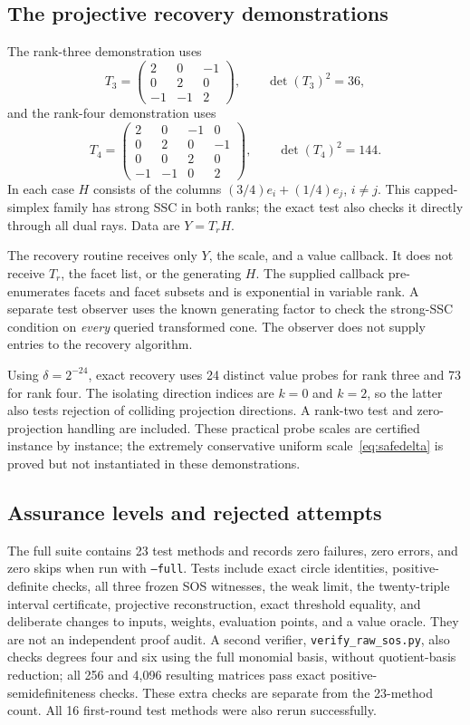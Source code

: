 \documentclass[11pt]{article}
\theoremstyle{definition}\newtheorem{definition}[theorem]{Definition}
\begin{document}
\subsection{The projective recovery demonstrations}
The rank-three demonstration uses
\begin{equation}
 T_3=\begin{pmatrix}2&0&-1\\0&2&0\\-1&-1&2\end{pmatrix},\qquad \det(T_3)^2=36,
\end{equation}
and the rank-four demonstration uses
\begin{equation}
 T_4=\begin{pmatrix}2&0&-1&0\\0&2&0&-1\\0&0&2&0\\-1&-1&0&2\end{pmatrix},\qquad \det(T_4)^2=144.
\end{equation}
In each case $H$ consists of the columns $(3/4)e_i+(1/4)e_j$, $i\ne j$. This capped-simplex family has strong SSC in both ranks; the exact test also checks it directly through all dual rays. Data are $Y=T_rH$.

The recovery routine receives only $Y$, the scale, and a value callback. It does not receive $T_r$, the facet list, or the generating $H$. The supplied callback pre-enumerates facets and facet subsets and is exponential in variable rank. A separate test observer uses the known generating factor to check the strong-SSC condition on \emph{every} queried transformed cone. The observer does not supply entries to the recovery algorithm.

Using $\delta=2^{-24}$, exact recovery uses 24 distinct value probes for rank three and 73 for rank four. The isolating direction indices are $k=0$ and $k=2$, so the latter also tests rejection of colliding projection directions. A rank-two test and zero-projection handling are included. These practical probe scales are certified instance by instance; the extremely conservative uniform scale~\eqref{eq:safedelta} is proved but not instantiated in these demonstrations.

\subsection{Assurance levels and rejected attempts}
The full suite contains 23 test methods and records zero failures, zero errors, and zero skips when run with \texttt{--full}. Tests include exact circle identities, positive-definite checks, all three frozen SOS witnesses, the weak limit, the twenty-triple interval certificate, projective reconstruction, exact threshold equality, and deliberate changes to inputs, weights, evaluation points, and a value oracle. They are not an independent proof audit. A second verifier, \texttt{verify\_raw\_sos.py}, also checks degrees four and six using the full monomial basis, without quotient-basis reduction; all 256 and 4,096 resulting matrices pass exact positive-semidefiniteness checks. These extra checks are separate from the 23-method count. All 16 first-round test methods were also rerun successfully.
\end{document}
